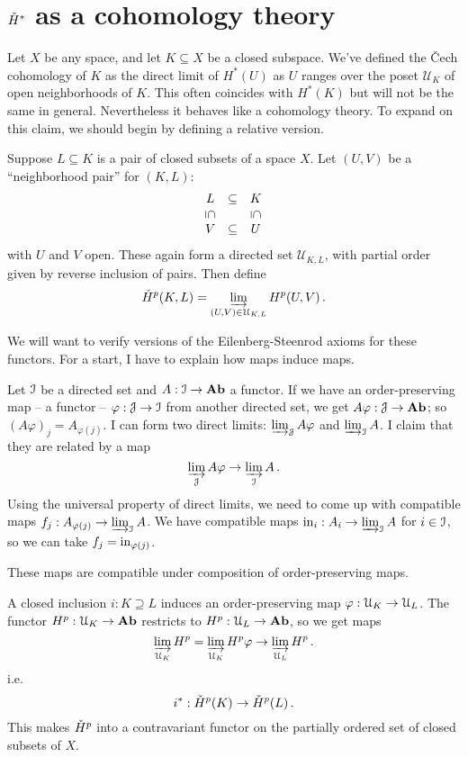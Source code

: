 \section{$\check{H}^\ast$ as a cohomology theory}


Let $X$ be any space, and let $K\subseteq X$ be a closed subspace.
We've defined the \v{C}ech cohomology of $K$ as the direct limit of 
$H^*(U)$ as $U$ ranges over the poset $\mathcal{U}_K$ of open neighborhoods
of $K$. This often coincides with $H^*(K)$ but will not be the same in
general. Nevertheless it behaves like a cohomology theory. To expand on
this claim, we should begin by defining a relative version. 

Suppose $L\subseteq K$ is a pair of  closed subsets of a space $X$.  Let 
$(U,V)$ be a ``neighborhood pair'' for $(K,L)$: 
\[
\begin{array}{ccc} L & \subseteq & K \\
\downsubseteq & & \downsubseteq \\
V & \subseteq & U
\end{array}
\]
with $U$ and $V$ open. These again form a directed set $\mathcal{U}_{K,L}$,
with partial order given by reverse inclusion of pairs. Then define
\[
\check{H}^p(K,L)=\varinjlim_{(U,V)\in\mathcal{U}_{K,L}} H^p(U,V)\,.
\]

We will want to verify versions of the Eilenberg-Steenrod axioms for these
functors. For a start, I have to explain how maps induce maps. 

Let $\mathcal I$ be a directed set and $A:\mathcal I\to \mathbf{Ab}$  a functor. 
If we have an order-preserving map -- a functor -- $\varphi:\mathcal J\to\mathcal I$ 
from another directed set, we get 
$A\varphi:\mathcal J\to\mathbf{Ab}$; so $(A\varphi)_j=A_{\varphi(j)}$.
I can form two direct limits: $\varinjlim_{\mathcal J}A\varphi$ and $\varinjlim_{\mathcal I}A$. I claim that they are related by a map 
\[
\varinjlim_{\mathcal J}A\varphi\to\varinjlim_{\mathcal I}A\,.
\] 
Using the universal property of direct limits, we need to come up with compatible maps $f_j:A_{\varphi(j)}\to\varinjlim_{\mathcal I}A$. We have compatible maps 
$\mathrm{in}_i:A_i\to\varinjlim_{\mathcal I}A$ for $i\in\mathcal I$, so we can take 
$f_j=\mathrm{in}_{\varphi(j)}$. 

These maps are compatible under composition of order-preserving maps. 

\begin{example}
A closed inclusion $i:K\supseteq L$ induces an order-preserving map
$\varphi:\mathcal U_K\to\mathcal U_L$. The functor $H^p:\mathcal U_K\to\mathbf{Ab}$ restricts
to $H^p:\mathcal U_L\to\mathbf{Ab}$, so we get maps
\[
\varinjlim_{\mathcal U_K}H^p=\varinjlim_{\mathcal U_K}H^p\varphi\to\varinjlim_{\mathcal U_L}H^p\,.
\]
i.e.
\[
i^*:\check{H}^p(K)\to\check{H}^p(L)\,.
\]
This makes $\check{H}^p$ into a contravariant functor on the partially ordered 
set of closed subsets of $X$. 
\end{example}

